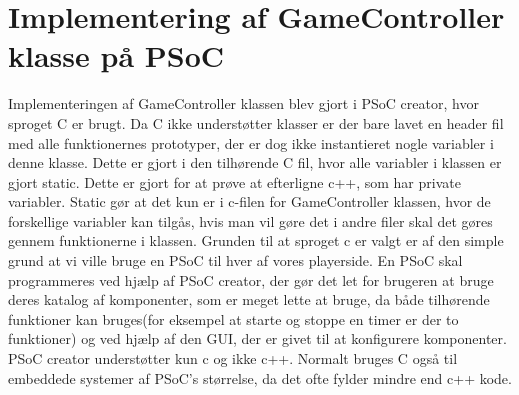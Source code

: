 \documentclass[Softwaredesign/Softwaredesign_main.tex]{subfiles}
\begin{document}
\section{Implementering af GameController klasse på PSoC}
Implementeringen af GameController klassen blev gjort i PSoC creator, hvor sproget C er brugt. Da C ikke understøtter klasser er der bare lavet en header fil med alle funktionernes prototyper, der er dog ikke instantieret nogle variabler i denne klasse. Dette er gjort i den tilhørende C fil, hvor alle variabler i klassen er gjort static. Dette er gjort for at prøve at efterligne c++, som har private variabler. Static gør at det kun er i c-filen for GameController klassen, hvor de forskellige variabler kan tilgås, hvis man vil gøre det i andre filer skal det gøres gennem funktionerne i klassen. Grunden til at sproget c er valgt er af den simple grund at vi ville bruge en PSoC til hver af vores playerside. En PSoC skal programmeres ved hjælp af PSoC creator, der gør det let for brugeren at bruge deres katalog af komponenter, som er meget lette at bruge, da både tilhørende funktioner kan bruges(for eksempel at starte og stoppe en timer er der to funktioner) og ved hjælp af den GUI, der er givet til at konfigurere komponenter. PSoC creator understøtter kun c og ikke c++. Normalt bruges C også til embeddede systemer af PSoC's størrelse, da det ofte fylder mindre end c++ kode.
\end{document}
